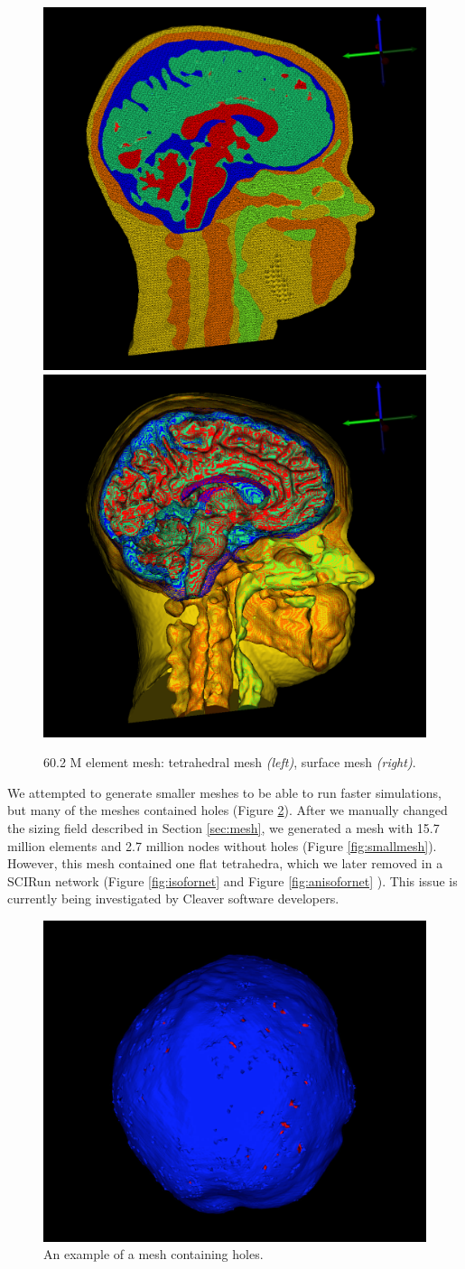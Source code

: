 \begin{figure}[H]
\begin{center}
\includegraphics[width=.49\textwidth]{Figures/bigmesh_1}
\includegraphics[width=.49\textwidth]{Figures/bigmesh_surface}
\caption{60.2 M element mesh: tetrahedral mesh \textit{(left)}, surface mesh \textit{(right)}.}
\label{fig:bigmesh}
\end{center}
\end{figure}

We attempted to generate smaller meshes to be able to run faster simulations, but many of the meshes contained holes (Figure \ref{fig:meshholes}). After we manually changed the sizing field described in Section \ref{sec:mesh}, we generated a mesh with 15.7 million elements and 2.7 million nodes without holes (Figure \ref{fig:smallmesh}). However, this mesh contained one flat tetrahedra, which we later removed in a SCIRun network (Figure \ref{fig:isofornet} and Figure \ref{fig:anisofornet} ). This issue is currently being investigated by Cleaver software developers.

\begin{figure}[H]
\begin{center}
\includegraphics[width=.60\textwidth]{Figures/mesh_with_holes}
\caption{An example of a mesh containing holes.}
\label{fig:meshholes}
\end{center}
\end{figure}

